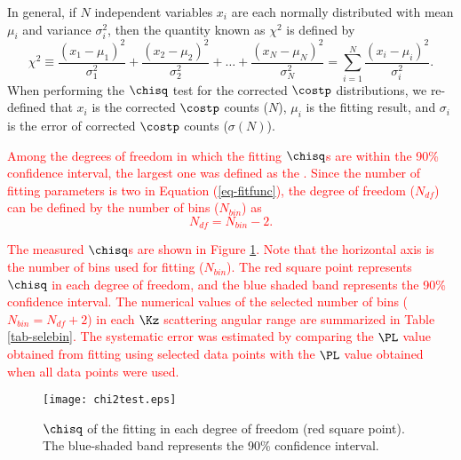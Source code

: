 In general, if $N$ independent variables $x_i$ are each normally distributed with mean $\mu_i$ and variance $\sigma_i^2$, then the quantity known as $\chi^2$ is defined by
\begin{equation}
  \chi^2 \equiv \frac{(x_1 - \mu_1)^2}{\sigma_1^2} + \frac{(x_2 - \mu_2)^2}{\sigma_2^2} + \dots + \frac{(x_N - \mu_N)^2}{\sigma_N^2} = \sum_{i=1}^N \frac{(x_i - \mu_i)^2}{\sigma_i^2}.
\end{equation}
When performing the $\chisq$ test for the corrected $\costp$ distributions, we re-defined that $x_i$ is the corrected $\costp$ counts ($N$), $\mu_i$ is the fitting result, and $\sigma_i$ is the error of corrected $\costp$ counts ($\sigma(N)$). 

\textcolor{red}{ Among the degrees of freedom in which the fitting $\chisq$s are within the 90\% confidence interval, the largest one was defined as the . Since the number of fitting parameters is two in Equation (\ref{eq-fitfunc}), the degree of freedom ($N_{df}$) can be defined by the number of bins ($N_{bin}$) as 
\begin{equation}
  N_{df} = N_{bin} - 2.
\end{equation} }

\textcolor{red}{ The measured $\chisq$s are shown in Figure \ref{fig-chi2test}. Note that the horizontal axis is the number of bins used for fitting ($N_{bin}$). The red square point represents $\chisq$ in each degree of freedom, and the blue shaded band represents the 90\% confidence interval. The numerical values of the selected number of bins ($N_{bin}=N_{df}+2$) in each $\Kz$ scattering angular range are summarized in Table \ref{tab-selebin}. The systematic error was estimated by comparing the $\PL$ value obtained from fitting using selected data points with the $\PL$ value obtained when all data points were used.}

\begin{figure}[!h]
  \centering
  \texttt{[image: chi2test.eps]}
  \caption{$\chisq$ of the fitting in each degree of freedom (red square point). The blue-shaded band represents the 90\% confidence interval.}
  \label{fig-chi2test}
\end{figure}


